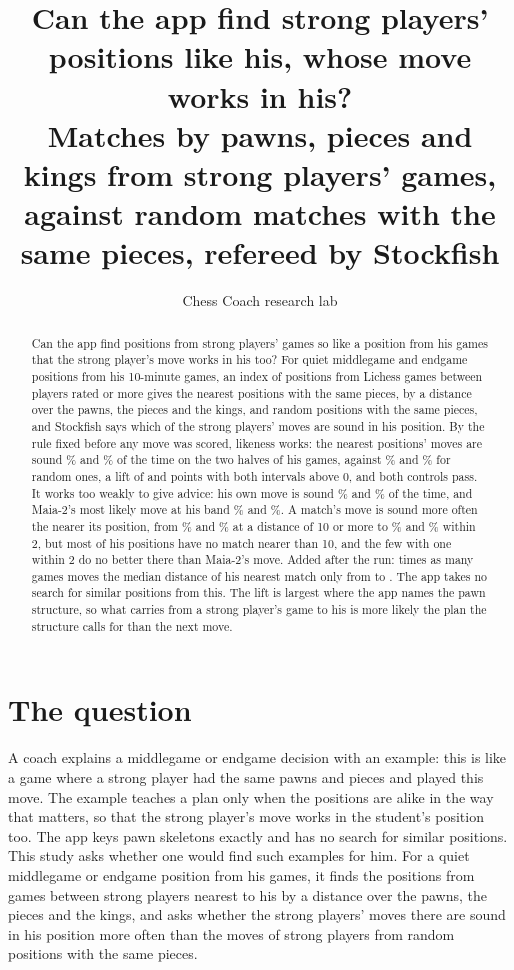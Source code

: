 \documentclass[11pt]{article}
\title{Can the app find strong players' positions like his, whose move works in his?\\[0.3em]
\large Matches by pawns, pieces and kings from \IndexGames{} strong players' games, against
random matches with the same pieces, refereed by Stockfish}
\author{Chess Coach research lab}
\date{}
\begin{document}
\maketitle

\begin{abstract}
Can the app find positions from strong players' games so like a position from his games that
the strong player's move works in his too? For \ScoredAll{} quiet middlegame and endgame positions
from his \Games{} 10-minute games, an index of \IndexPositions{} positions from \IndexGames{}
Lichess games between players rated \Floor{} or more gives the \Arm{} nearest positions with the
same pieces, by a distance over the pawns, the pieces and the kings, and \Arm{} random positions
with the same pieces, and Stockfish says which of the strong players' moves are sound in his
position. By the rule fixed before any move was scored, likeness works: the nearest positions'
moves are sound \TFirst\% and \TSecond\% of the time on the two halves of his games, against
\RFirst\% and \RSecond\% for random ones, a lift of \LiftFirst{} and \LiftSecond{} points with
both intervals above 0, and both controls pass. It works too weakly to give advice: his own move
is sound \AFirst\% and \ASecond\% of the time, and Maia-2's most likely move at his band \NFirst\%
and \NSecond\%. A match's move is sound more often the nearer its position, from \DistTenFirst\%
and \DistTenSecond\% at a distance of 10 or more to \DistZeroFirst\% and \DistZeroSecond\% within
2, but most of his positions have no match nearer than 10, and the few with one within 2 do no
better there than Maia-2's move. Added after the run: \ScaleFactor{} times as many games moves the
median distance of his nearest match only from \ScaleMedianFirst{} to \ScaleMedianLast. The app
takes no search for similar positions from this. The lift is largest where the app names the
pawn structure, so what carries from a strong player's game to his is more likely the plan the
structure calls for than the next move.
\end{abstract}

\section{The question}

A coach explains a middlegame or endgame decision with an example: this is like a game where a
strong player had the same pawns and pieces and played this move. The example teaches a plan
only when the positions are alike in the way that matters, so that the strong player's move works
in the student's position too. The app keys pawn skeletons exactly and has no search for similar
positions. This study asks whether one would find such examples for him. For a quiet middlegame
or endgame position from his games, it finds the positions from games between strong players
nearest to his by a distance over the pawns, the pieces and the kings, and asks whether the strong
players' moves there are sound in his position more often than the moves of strong players from
random positions with the same pieces.
\end{document}
